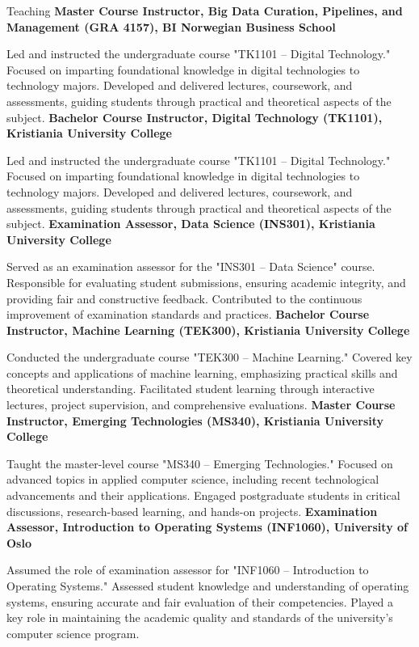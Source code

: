 \begin{rubric}{Teaching}
\entry*[2023]%
\textbf{Master Course Instructor, Big Data Curation, Pipelines, and Management (GRA 4157), BI Norwegian Business School} \par
Led and instructed the undergraduate course "TK1101 – Digital Technology."
Focused on imparting foundational knowledge in digital technologies to technology majors.
Developed and delivered lectures, coursework, and assessments, guiding students through practical and theoretical aspects of the subject.
%
\entry*[2020]%
\textbf{Bachelor Course Instructor, Digital Technology (TK1101), Kristiania University College} \par
Led and instructed the undergraduate course "TK1101 – Digital Technology."
Focused on imparting foundational knowledge in digital technologies to technology majors.
Developed and delivered lectures, coursework, and assessments, guiding students through practical and theoretical aspects of the subject.
%
\entry*[2019]%
\textbf{Examination Assessor, Data Science (INS301), Kristiania University College} \par
Served as an examination assessor for the "INS301 – Data Science" course.
Responsible for evaluating student submissions, ensuring academic integrity, and providing fair and constructive feedback.
Contributed to the continuous improvement of examination standards and practices.
%
\entry*[2019]%
\textbf{Bachelor Course Instructor, Machine Learning (TEK300), Kristiania University College} \par
Conducted the undergraduate course "TEK300 – Machine Learning."
Covered key concepts and applications of machine learning, emphasizing practical skills and theoretical understanding.
Facilitated student learning through interactive lectures, project supervision, and comprehensive evaluations.
%
\entry*[2019]%
\textbf{Master Course Instructor, Emerging Technologies (MS340), Kristiania University College} \par
Taught the master-level course "MS340 – Emerging Technologies."
Focused on advanced topics in applied computer science, including recent technological advancements and their applications.
Engaged postgraduate students in critical discussions, research-based learning, and hands-on projects.
%
\entry*[2019]%
\textbf{Examination Assessor, Introduction to Operating Systems (INF1060), University of Oslo} \par
Assumed the role of examination assessor for "INF1060 – Introduction to Operating Systems."
Assessed student knowledge and understanding of operating systems, ensuring accurate and fair evaluation of their competencies.
Played a key role in maintaining the academic quality and standards of the university’s computer science program.
\end{rubric}